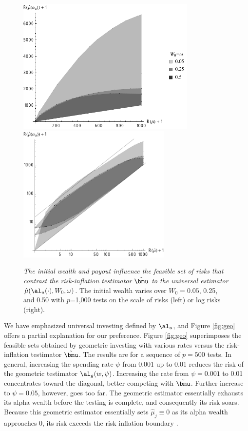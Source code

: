 \documentclass{gSCS2e}
\newcommand{\uTest}{\mbox{$\hat\mu(\al_u(\cdot),W_0,\omega)$}}
\begin{document}
\begin{figure}
 \caption{ \label{fig:univRI} {\sl The initial wealth and payout influence the 
  feasible set of risks that contrast the risk-inflation testimator $\tilde\bmu$  to the universal estimator
 \uTest.} The initial wealth varies over $W_0=0.05$,
 0.25, and 0.50 with $p$=1,000 tests on the scale of risks (left) or log risks
 (right).  }

 \vspace{0.1in}
 \centerline{
 \includegraphics[width=3.5in]{figures/univVsRI_bw}
 \includegraphics[width=3.0in]{figures/univVsRILog_bw}    }
 \vspace{0.2in}
\end{figure}


 We have emphasized universal investing defined by $\al_u$, and Figure
 \ref{fig:geo} offers a partial explanation for our preference.  Figure \ref{fig:geo}
 superimposes the feasible sets obtained by geometric investing with various rates versus
 the risk-inflation testimator $\tilde\bmu$.  The results are for a sequence of $p = 500$ tests.  In
 general, increasing the spending rate $\psi$ from 0.001 up to 0.01 reduces the risk of
 the geometric testimator $\al_g(w,\psi)$. Increasing the rate from $\psi=0.001$ to
 0.01  concentrates toward the diagonal, better competing with $\tilde\bmu$.  
 Further increase to $\psi = 0.05$, however, goes too far.  The geometric estimator
 essentially exhausts its alpha wealth before the testing is complete, and consequently
 its risk soars.  Because this geometric estimator essentially sets $\hat\mu_j \equiv 0$
 as its alpha wealth approaches 0, its risk exceeds the risk inflation boundary
 .
\end{document}
